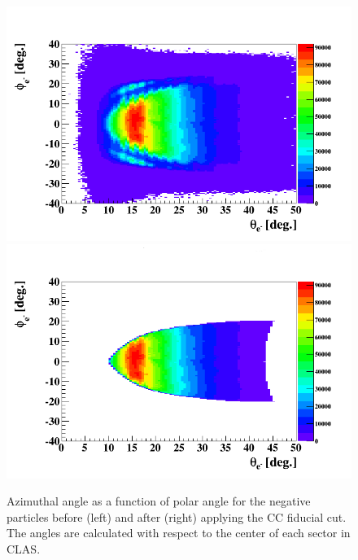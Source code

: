 \begin{itemize}
\begin{itemize}
\begin{figure}[tbp]
\hspace{-0.2in}
\includegraphics[scale=0.35]{fig_analysis/CC_el_phi_theta_1.png}
\includegraphics[scale=0.35]{fig_analysis/CC_el_phi_theta_2.png}
\caption{Azimuthal angle as a function of polar angle for the negative particles before (left) and after (right) applying the CC fiducial cut. The angles are calculated with respect to the center of each sector in CLAS.} 
\label{fig:CC_cut}
\end{figure}


\end{itemize}
\end{itemize}
